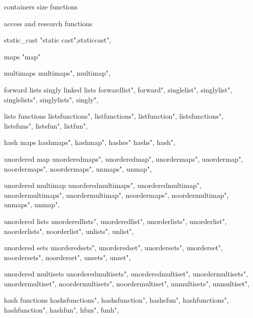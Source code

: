          containers size functions 
        
         access and research functions 
        
         static_cast 
         "static cast",staticcast",
        
         maps
         "map"
        
         multimaps
        multimaps", 
        multimap",
        
         forward lists singly linked lists
        forwardlist",  
        forward",  
        singlelist",  
        singlylist",  
        singlelists",  
        singlylists",  
        singly",  
        
         lists functions 
        listsfunctions",  
        listfunctions",  
        listfunction",  
        listsfunctions",  
        listsfuns",  
        listsfun",  
        listfun",  
         
         hash maps 
        hashmaps", 
        hashmap",
        hashes"
        hashs",
        hash",
        
         unordered map 
        unorderedmaps", 
        unorderedmap", 
        unordermaps", 
        unordermap", 
        noordermaps", 
        noordermaps", 
        unmaps", 
        unmap", 
         
         unordered multimap 
        unorderedmultimaps", 
        unorderedmultimap", 
        unordermultimaps", 
        unordermultimap", 
        noordermaps", 
        noordermultimap", 
        unmaps", 
        unmap", 
        
         unordered lists 
        unorderedlists", 
        unorderedlist", 
        unorderlists", 
        unorderlist", 
        noorderlists", 
        noorderlist", 
        unlists", 
        unlist", 
        
         unordered sets
        unorderedsets", 
        unorderedset", 
        unordersets", 
        unorderset", 
        noordersets", 
        noorderset", 
        unsets", 
        unset", 
        
         unordered multisets
        unorderedmultisets", 
        unorderedmultiset", 
        unordermultisets", 
        unordermultiset", 
        noordermultisets", 
        noordermultiset", 
        unmultisets", 
        unmultiset", 
        
         hash functions
        hashsfunctions",  
        hashsfunction",  
        hashsfun",  
        hashfunctions",  
        hashfunction",  
        hashfun",  
        hfun",  
        funh",  
        
